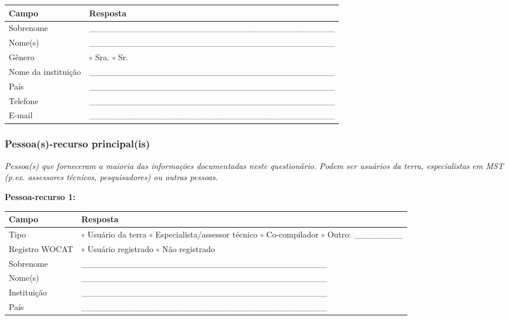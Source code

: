 {
\begin{longtable}[]{@{}ll@{}}
\toprule\noalign{}
Campo & Resposta \\
\midrule\noalign{}
\endhead
\bottomrule\noalign{}
\endlastfoot
Sobrenome & \_\_\_\_\_\_\_\_\_\_\_\_\_\_\_\_\_\_\_\_\_\_\_\_\_\_\_\_\_\_\_\_\_\_\_\_\_\_\_\_ \\
Nome(s) & \_\_\_\_\_\_\_\_\_\_\_\_\_\_\_\_\_\_\_\_\_\_\_\_\_\_\_\_\_\_\_\_\_\_\_\_\_\_\_\_ \\
Gênero & $\circ$ Sra. $\circ$ Sr. \\
Nome da instituição & \_\_\_\_\_\_\_\_\_\_\_\_\_\_\_\_\_\_\_\_\_\_\_\_\_\_\_\_\_\_\_\_\_\_\_\_\_\_\_\_ \\
País & \_\_\_\_\_\_\_\_\_\_\_\_\_\_\_\_\_\_\_\_\_\_\_\_\_\_\_\_\_\_\_\_\_\_\_\_\_\_\_\_ \\
Telefone & \_\_\_\_\_\_\_\_\_\_\_\_\_\_\_\_\_\_\_\_\_\_\_\_\_\_\_\_\_\_\_\_\_\_\_\_\_\_\_\_ \\
E-mail & \_\_\_\_\_\_\_\_\_\_\_\_\_\_\_\_\_\_\_\_\_\_\_\_\_\_\_\_\_\_\_\_\_\_\_\_\_\_\_\_ \\
\end{longtable}
}

\subsubsection{Pessoa(s)-recurso principal(is)}\label{pessoas-recurso-principalis}

\emph{Pessoa(s) que forneceram a maioria das informações documentadas neste questionário. Podem ser usuários da terra, especialistas em MST (p.ex. assessores técnicos, pesquisadores) ou outras pessoas.}

\textbf{Pessoa-recurso 1:}

{
\begin{longtable}[]{@{}
  >{\raggedright\arraybackslash}p{}
  >{\raggedright\arraybackslash}p{}@{}}
\toprule\noalign{}
\begin{minipage}[b]{\linewidth}\raggedright
Campo
\end{minipage} & \begin{minipage}[b]{\linewidth}\raggedright
Resposta
\end{minipage} \\
\midrule\noalign{}
\endhead
\bottomrule\noalign{}
\endlastfoot
Tipo & $\circ$ Usuário da terra $\circ$ Especialista/assessor técnico $\circ$ Co-compilador $\circ$ Outro: \_\_\_\_\_\_\_\_ \\
Registro WOCAT & $\circ$ Usuário registrado $\circ$ Não registrado \\
Sobrenome & \_\_\_\_\_\_\_\_\_\_\_\_\_\_\_\_\_\_\_\_\_\_\_\_\_\_\_\_\_\_\_\_\_\_\_\_\_\_\_\_ \\
Nome(s) & \_\_\_\_\_\_\_\_\_\_\_\_\_\_\_\_\_\_\_\_\_\_\_\_\_\_\_\_\_\_\_\_\_\_\_\_\_\_\_\_ \\
Instituição & \_\_\_\_\_\_\_\_\_\_\_\_\_\_\_\_\_\_\_\_\_\_\_\_\_\_\_\_\_\_\_\_\_\_\_\_\_\_\_\_ \\
País & \_\_\_\_\_\_\_\_\_\_\_\_\_\_\_\_\_\_\_\_\_\_\_\_\_\_\_\_\_\_\_\_\_\_\_\_\_\_\_\_ \\
\end{longtable}
}

